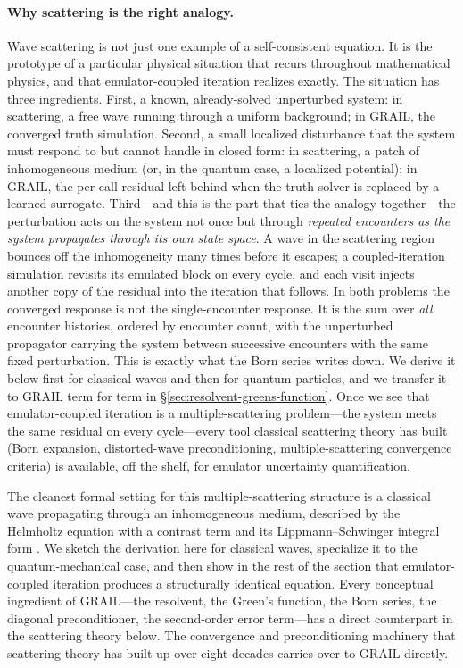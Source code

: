 \documentclass[11pt]{article}
\begin{document}
\paragraph{Why scattering is the right analogy.}
Wave scattering is not just one example of a self-consistent equation.
It is the prototype of a particular physical situation that recurs
throughout mathematical physics, and that emulator-coupled iteration
realizes exactly.  The situation has three ingredients.  First, a
known, already-solved unperturbed system: in scattering, a free wave
running through a uniform background; in GRAIL, the converged truth
simulation.  Second, a small localized disturbance that the system
must respond to but cannot handle in closed form: in scattering, a
patch of inhomogeneous medium (or, in the quantum case, a localized
potential); in GRAIL, the per-call residual left behind when the
truth solver is replaced by a learned surrogate.  Third---and this is
the part that ties the analogy together---the perturbation acts on
the system not once but through \emph{repeated encounters as the
system propagates through its own state space}.  A wave in the
scattering region bounces off the inhomogeneity many times before it
escapes; a coupled-iteration simulation revisits its emulated block
on every cycle, and each visit injects another copy of the residual
into the iteration that follows.  In both problems the converged
response is not the single-encounter response.  It is the sum over
\emph{all} encounter histories, ordered by encounter count, with the
unperturbed propagator carrying the system between successive
encounters with the same fixed perturbation.  This is exactly what
the Born series writes down.  We derive it below first for classical
waves and then for quantum particles, and we transfer it to GRAIL
term for term in \S\ref{sec:resolvent-greens-function}.  Once we see
that emulator-coupled iteration is a multiple-scattering problem---the
system meets the same residual on every cycle---every tool classical
scattering theory has built (Born expansion, distorted-wave
preconditioning, multiple-scattering convergence criteria) is
available, off the shelf, for emulator uncertainty quantification.

The cleanest formal setting for this multiple-scattering structure is
a classical wave propagating through an inhomogeneous medium,
described by the Helmholtz equation with a contrast term and its
Lippmann--Schwinger integral form \citep{LippmannSchwinger1950}.  We
sketch the derivation here for classical waves, specialize it to the
quantum-mechanical case, and then show in the rest of the section
that emulator-coupled iteration produces a structurally identical
equation.  Every conceptual ingredient of GRAIL---the resolvent, the
Green's function, the Born series, the diagonal preconditioner, the
second-order error term---has a direct counterpart in the scattering
theory below.  The convergence and preconditioning machinery that
scattering theory has built up over eight decades carries over to
GRAIL directly.
\end{document}
